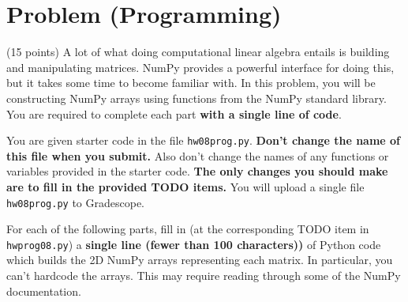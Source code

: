 \documentclass{article}
\theoremstyle{remark}
\begin{document}
\pagebreak
\section{Problem (Programming)}

(15 points)
A lot of what doing computational linear algebra entails is building and manipulating matrices.
NumPy provides a powerful interface for doing this, but it takes some time to become familiar with.
In this problem, you will be constructing NumPy arrays using functions from the NumPy standard library.
You are required to complete each part \textbf{with a single line of code}.

You are given starter code in the file \texttt{hw08prog.py}.
\textbf{Don't change the name of this file when you submit.}
Also don't change the names of any functions or variables provided in the starter code.
\textbf{The only changes you should make are to fill in the provided TODO items.}
You will upload a single file \texttt{hw08prog.py} to Gradescope.

For each of the following parts, fill in (at the corresponding TODO item in \texttt{hwprog08.py}) a \textbf{single line (fewer than 100 characters))} of Python code which builds the 2D NumPy arrays representing each matrix.
In particular, you can't hardcode the arrays.
This may require reading through some of the NumPy documentation.
\end{document}
